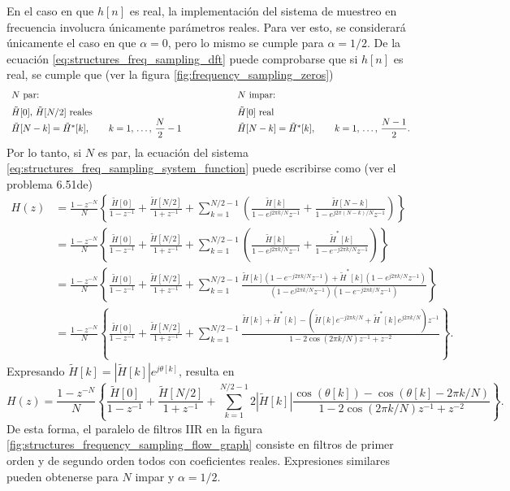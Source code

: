 \documentclass[a4paper]{report}
\begin{document}
En el caso en que \(h[n]\) es real, la implementación del sistema de muestreo en frecuencia involucra únicamente parámetros reales. Para ver esto, se considerará únicamente el caso en que \(\alpha=0\), pero lo mismo se cumple para \(\alpha=1/2\). De la ecuación \ref{eq:structures_freq_sampling_dft} puede comprobarse que si \(h[n]\) es real, se cumple que (ver la figura \ref{fig:frequency_sampling_zeros})
\[
 \begin{array}{lcl}
  N\textrm{ par:} & \qquad\qquad &N\textrm{ impar:}\\[\medskipamount]
  \tilde{H}[0],\,\tilde{H}[N/2]\textrm{ reales} & \qquad\qquad & \tilde{H}[0]\textrm{ real}\\
  \tilde{H}[N-k]=\tilde{H}^*[k],\qquad k=1,\,\dots,\,\dfrac{N}{2}-1 & \qquad\qquad & 
  \tilde{H}[N-k]=\tilde{H}^*[k],\qquad k=1,\,\dots,\,\dfrac{N-1}{2}.
 \end{array}
\]
Por lo tanto, si \(N\) es par, la ecuación del sistema \ref{eq:structures_freq_sampling_system_function} puede escribirse como (ver el problema 6.51de\cite{oppenheim2009discrete})
\begin{align*}
 H(z)&=\frac{1-z^{-N}}{N}\left\{\frac{\tilde{H}[0]}{1-z^{-1}}+\frac{\tilde{H}[N/2]}{1+z^{-1}}+\sum_{k=1}^{N/2-1}\left(\frac{\tilde{H}[k]}{1-e^{j2\pi k/N}z^{-1}}+\frac{\tilde{H}[N-k]}{1-e^{j2\pi(N-k)/N}z^{-1}}\right)\right\}\\
  &=\frac{1-z^{-N}}{N}\left\{\frac{\tilde{H}[0]}{1-z^{-1}}+\frac{\tilde{H}[N/2]}{1+z^{-1}}+\sum_{k=1}^{N/2-1}\left(\frac{\tilde{H}[k]}{1-e^{j2\pi k/N}z^{-1}}+\frac{\tilde{H}^*[k]}{1-e^{-j2\pi k/N}z^{-1}}\right)\right\}\\
  &=\frac{1-z^{-N}}{N}\left\{\frac{\tilde{H}[0]}{1-z^{-1}}+\frac{\tilde{H}[N/2]}{1+z^{-1}}+\sum_{k=1}^{N/2-1}\frac{\tilde{H}[k](1-e^{-j2\pi k/N}z^{-1})+\tilde{H}^*[k](1-e^{j2\pi k/N}z^{-1})}{(1-e^{j2\pi k/N}z^{-1})(1-e^{-j2\pi k/N}z^{-1})}\right\}\\
  &=\frac{1-z^{-N}}{N}\left\{\frac{\tilde{H}[0]}{1-z^{-1}}+\frac{\tilde{H}[N/2]}{1+z^{-1}}+\sum_{k=1}^{N/2-1}\frac{\tilde{H}[k]+\tilde{H}^*[k]-(\tilde{H}[k]e^{-j2\pi k/N}+\tilde{H}^*[k]e^{j2\pi k/N})z^{-1}}{1-2\cos(2\pi k/N)z^{-1}+z^{-2}}\right\}.
\end{align*}
Expresando \(\tilde{H}[k]=|\tilde{H}[k]|e^{j\theta[k]}\), resulta en
\[
 H(z)=\frac{1-z^{-N}}{N}\left\{\frac{\tilde{H}[0]}{1-z^{-1}}+\frac{\tilde{H}[N/2]}{1+z^{-1}}+\sum_{k=1}^{N/2-1}2|\tilde{H}[k]|\frac{\cos(\theta[k])-\cos(\theta[k]-2\pi k/N)}{1-2\cos(2\pi k/N)z^{-1}+z^{-2}}\right\}.
\]
De esta forma, el paralelo de filtros IIR en la figura \ref{fig:structures_frequency_sampling_flow_graph} consiste en filtros de primer orden y de segundo orden todos con coeficientes reales. Expresiones similares pueden obtenerse para \(N\) impar y \(\alpha=1/2\).
\end{document}
